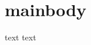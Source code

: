 \documentclass{article}
\begin{document}
\section{mainbody}
text\nocite{*}
text
\printbibliography
\end{document}
